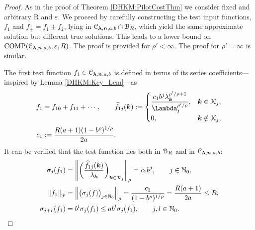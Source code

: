 \documentclass[USenglish]{article}
\theoremstyle{dgthm}
\theoremstyle{dgthm}
\theoremstyle{dgthm}
\theoremstyle{dgthm}
\theoremstyle{dgdef}
\theoremstyle{definition}
\DeclareMathOperator{\DHKMCOMP}{COMP}
\newcommand{\DHKMhf}{\widehat{f}}
\newcommand{\DHKMnorm}[2][{}]{\ensuremath{\left \lVert #2 \right \rVert}_{#1}}
\begin{document}
\begin{proof}

As in the proof of Theorem \ref{DHKM:PilotCostThm} we consider fixed and arbitrary R and $\varepsilon$.
We proceed by carefully constructing the test input functions, $f_1$ and $f_{\pm} = f_1 \pm f_2$, lying in ${\mathcal{C}}_{\boldsymbol{\lambda},{\boldsymbol{n}},a,b}\cap {\mathcal{B}}_{R}$, which yield the same approximate solution but different true solutions.  This leads to a lower bound on $\DHKMCOMP(\calC_{\boldsymbol{\lambda},\bsn,a,b},\varepsilon,R)$. The proof is provided for $\rho' < \infty$.  The proof for $\rho' = \infty$ is similar.

The first test function $f_1 \in {\mathcal{C}}_{\boldsymbol{\lambda},{\boldsymbol{n}},a,b}$ is defined in terms of its series coefficients---inspired by Lemma \ref{DHKM:Key_Lem}---as
\begin{align}
\nonumber
f_1 &= f_{10} + f_{11} +  \cdots, \qquad
\DHKMhf_{1j}(\bsk) := \begin{cases}
\displaystyle
\frac{c_1 b^{j} \lambda_{\bsk}^{\rho'/\rho+1}}{\Lambda_j^{\rho'/\rho}},  & \bsk \in \calK_j,
\\
0, & \bsk \notin \calK_j,
\end{cases}
\\
\nonumber
c_1 &:=  \frac{R(a+1)(1 - b^\rho)^{1/\rho}}{2a}.
\end{align}
It can be verified that the test function lies both in ${\mathcal{B}}_{R}$ and in ${\mathcal{C}}_{\boldsymbol{\lambda},{\boldsymbol{n}},a,b}$:
\begin{align}
\nonumber
\sigma_j(f_1) & = \DHKMnorm[\rho]{\biggl(\frac{\DHKMhf_{1j}(\bsk)}{\lambda_{\bsk}} \biggr)_{\bsk \in \calK_j}} 
= c_1 b^j, \qquad j \in \N_0,\\
\nonumber
\DHKMnorm[\calF]{f_1} &= \DHKMnorm[\rho]{\bigl( \sigma_j(f) \bigr)_{j \in \N_0} } 
=  \frac{c_1}{(1 - b^\rho)^{1/\rho}} = \frac{R(a+1)}{2a} \le R,
\\
\nonumber
\sigma_{j+r}(f_1) &= 
b^{l} \sigma_j(f_1) \le a b^l \sigma_j(f_1), \qquad j,l \in \N_0.
\end{align}


\end{proof}
\end{document}

